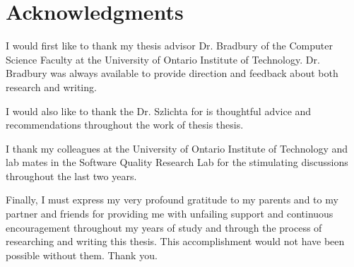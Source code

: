 \chapter*{Acknowledgments}

I would first like to thank my thesis advisor Dr. Bradbury of the Computer Science Faculty at the University of Ontario Institute of Technology. Dr. Bradbury was always available to provide direction and feedback about both research and writing.

I would also like to thank the Dr. Szlichta for is thoughtful advice and recommendations throughout the work of thesis thesis.

I thank my colleagues at the University of Ontario Institute of Technology and lab mates in the Software Quality Research Lab for the stimulating discussions throughout the last two years.

Finally, I must express my very profound gratitude to my parents and to my partner and friends for providing me with unfailing support and continuous encouragement throughout my years of study and through the process of researching and writing this thesis. This accomplishment would not have been possible without them. Thank you.